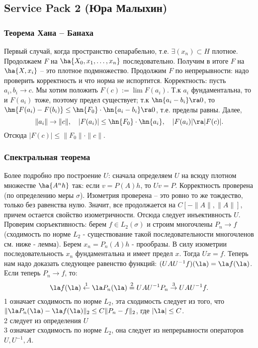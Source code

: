\documentclass[a4paper]{article}
\begin{document}
\subsection{Service Pack 2 (Юра Малыхин)}

\subsubsection{Теорема Хана -- Банаха}

Первый случай, когда пространство сепарабельно, т.е. $\exi (x_n)\subset H$ плотное.
Продолжаем $F$ на $\ha{X_0,x_1,\ldots,x_n}$ последовательно. Получим в итоге $F$ на $\ha{X,x_i}$ --
это плотное подмножество. Продолжим $F$ по непрерывности: надо проверить корректность и что норма
не испортится. Корректность: пусть $a_i,b_i\to c$. Мы хотим положить $F(c):=\lim F(a_i)$. Т.к $a_i$
фундаментальна, то и $F(a_i)$ тоже, поэтому предел существует; т.к
$\hn{a_i-b_i}\ra 0$, то $\hm{F(a_i)-F(b_i)} \le \hn{F_0}\cdot \hn{a_i-b_i} \ra 0$, т.е.
пределы равны. Далее,
$$\|a_i\|\to \|c\|, \quad |F(a_i)|\le \hn{F_0}\cdot \hn{a_i}, \quad |F(a_i)|\ra|F(c)|.$$
Отсюда $|F(c)|\le \|F_0\|\cdot \|c\|$.


\subsubsection{Спектральная теорема}

Более подробно про построение $U$: сначала определяем $U$ на всюду плотном множестве $\ha{A^n h}$ так: если
$v=P(A)h$, то $Uv=P$.  Корректность проверена (по определению меры $\sigma$). Изометрия проверена -- это ровно
то же тождество, только без равенства нулю. Значит, все продолжается на $C[-\|A\|,\|A\|]$, причем остается
свойство изометричности. Отсюда следует инъективность $U$. Проверим сюръективность: берем $f\in L_2(\sigma)$
и строим многочлены $P_n\to f$ (сходимость по норме $L_2$ - существование такой последовательности
многочленов см. ниже - лемма). Берем $x_n=P_n(A)h$ - прообразы. В силу изометрии последовательность $x_n$
фундаментальна и имеет предел $x$. Тогда $Ux=f$. Теперь нам надо доказать следующее равенство функций:
$(UAU^{-1}f)(\la)=\la f(\la)$. Если теперь $P_n\to f$, то:
$$\la f(\la)\stackrel{1}{\gets} \la P_n(\la)\stackrel{2}=
UAU^{-1}P_n\stackrel{3}{\to}UAU^{-1}f.$$
1 означает сходимость по норме $L_2$, эта сходимость следует из того, что
$\|\la P_n(\la)-\la f(\la)\|_2 \le C\|P_n-f\|_2$, где $|\la|\le C$.\\
2 следует из определения $U$\\
3 означает сходимость по норме $L_2$, она следует из непрерывности операторов $U, U^{-1}, A$.
\end{document}
